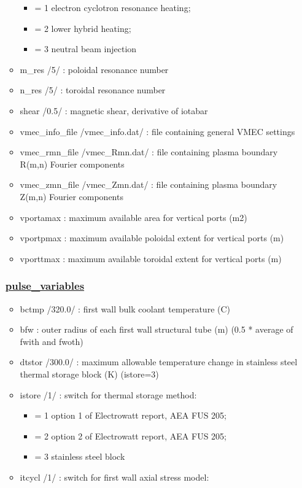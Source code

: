 \documentclass[]{article}
\providecommand{\tightlist}{%
  \setlength{\itemsep}{0pt}\setlength{\parskip}{0pt}}
\begin{document}
\begin{itemize}
\begin{itemize}
    \begin{itemize}
    \tightlist
    \item
      = 1 electron cyclotron resonance heating;
    \item
      = 2 lower hybrid heating;
    \item
      = 3 neutral beam injection
    \end{itemize}
  \item
    m\_res /5/ : poloidal resonance number
  \item
    n\_res /5/ : toroidal resonance number
  \item
    shear /0.5/ : magnetic shear, derivative of iotabar
  \item
    vmec\_info\_file /vmec\_info.dat/ : file containing general VMEC
    settings
  \item
    vmec\_rmn\_file /vmec\_Rmn.dat/ : file containing plasma boundary
    R(m,n) Fourier components
  \item
    vmec\_zmn\_file /vmec\_Zmn.dat/ : file containing plasma boundary
    Z(m,n) Fourier components
  \item
    vportamax : maximum available area for vertical ports (m2)
  \item
    vportpmax : maximum available poloidal extent for vertical ports (m)
  \item
    vporttmax : maximum available toroidal extent for vertical ports (m)
  \end{itemize}

  \subsubsection{\texorpdfstring{\href{pulse_variables.html}{pulse\_variables}}{pulse\_variables}}\label{pulse_variables}

  \begin{itemize}
  \tightlist
  \item
    bctmp /320.0/ : first wall bulk coolant temperature (C)
  \item
    bfw : outer radius of each first wall structural tube (m) (0.5 *
    average of fwith and fwoth)
  \item
    dtstor /300.0/ : maximum allowable temperature change in stainless
    steel thermal storage block (K) (istore=3)
  \item
    istore /1/ : switch for thermal storage method:

    \begin{itemize}
    \tightlist
    \item
      = 1 option 1 of Electrowatt report, AEA FUS 205;
    \item
      = 2 option 2 of Electrowatt report, AEA FUS 205;
    \item
      = 3 stainless steel block
    \end{itemize}
  \item
    itcycl /1/ : switch for first wall axial stress model:


\end{itemize}
\end{itemize}
\end{document}
